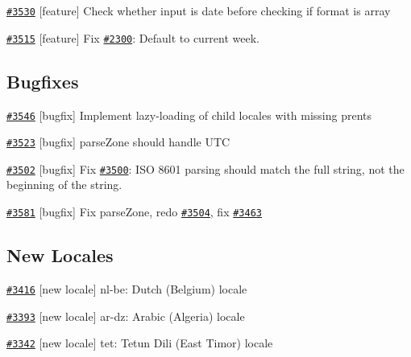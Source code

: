 \begin{DoxyItemize}
\item \href{https://github.com/moment/moment/pull/3530}{\tt \#3530} \mbox{[}feature\mbox{]} Check whether input is date before checking if format is array
\item \href{https://github.com/moment/moment/pull/3515}{\tt \#3515} \mbox{[}feature\mbox{]} Fix \href{https://github.com/moment/moment/issues/2300}{\tt \#2300}\+: Default to current week.
\end{DoxyItemize}

\subsection*{Bugfixes}


\begin{DoxyItemize}
\item \href{https://github.com/moment/moment/pull/3546}{\tt \#3546} \mbox{[}bugfix\mbox{]} Implement lazy-\/loading of child locales with missing prents
\item \href{https://github.com/moment/moment/pull/3523}{\tt \#3523} \mbox{[}bugfix\mbox{]} parse\+Zone should handle U\+TC
\item \href{https://github.com/moment/moment/pull/3502}{\tt \#3502} \mbox{[}bugfix\mbox{]} Fix \href{https://github.com/moment/moment/issues/3500}{\tt \#3500}\+: I\+SO 8601 parsing should match the full string, not the beginning of the string.
\item \href{https://github.com/moment/moment/pull/3581}{\tt \#3581} \mbox{[}bugfix\mbox{]} Fix parse\+Zone, redo \href{https://github.com/moment/moment/issues/3504}{\tt \#3504}, fix \href{https://github.com/moment/moment/issues/3463}{\tt \#3463}
\end{DoxyItemize}

\subsection*{New Locales}


\begin{DoxyItemize}
\item \href{https://github.com/moment/moment/pull/3416}{\tt \#3416} \mbox{[}new locale\mbox{]} nl-\/be\+: Dutch (Belgium) locale
\item \href{https://github.com/moment/moment/pull/3393}{\tt \#3393} \mbox{[}new locale\mbox{]} ar-\/dz\+: Arabic (Algeria) locale
\item \href{https://github.com/moment/moment/pull/3342}{\tt \#3342} \mbox{[}new locale\mbox{]} tet\+: Tetun Dili (East Timor) locale
\end{DoxyItemize}

